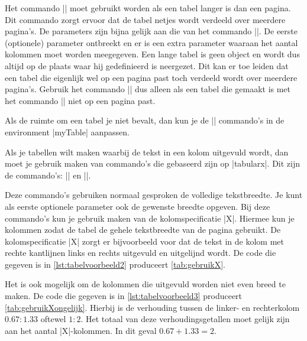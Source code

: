 Het commando |\langetabel| moet gebruikt worden als een tabel langer is dan een pagina.
Dit commando zorgt ervoor dat de tabel netjes wordt verdeeld over meerdere pagina's.
De parameters zijn bijna gelijk aan die van het commando |\tabel|.
De eerste (optionele) parameter ontbreekt en er is een extra parameter waaraan het aantal kolommen moet worden meegegeven.
Een lange tabel is geen  object en wordt dus altijd op de plaats waar hij gedefinieerd is neergezet.
Dit kan er toe leiden dat een tabel die eigenlijk wel op een pagina past toch verdeeld wordt over meerdere pagina's.
Gebruik het commando |\langetabel| dus alleen als een tabel die gemaakt is met het commando |\tabel| niet op een pagina past.

Als de ruimte om een tabel je niet bevalt, dan kun je de |\vspace| commando's in de environment |myTable| aanpassen.

Als je tabellen wilt maken waarbij de tekst in een kolom uitgevuld wordt, dan moet je gebruik maken van commando's die gebaseerd zijn op |tabularx|. 
Dit zijn de commando's:
|\tabelX| en |\langetabelX|.

Deze commando's gebruiken normaal gesproken de volledige tekstbreedte.
Je kunt als eerste optionele parameter ook de gewenste breedte opgeven.
Bij deze commando's kun je gebruik maken van de kolomspecificatie |X|. 
Hiermee kun je kolommen  zodat de tabel de gehele tekstbreedte van de pagina gebruikt.
De kolomspecificatie |X| zorgt er bijvoorbeeld voor dat de tekst in de kolom met rechte kantlijnen links en rechts uitgevuld en uitgelijnd wordt.
De code die gegeven is in \cref{lst:tabelvoorbeeld2} produceert \cref{tab:gebruikX}.



Het is ook mogelijk om de kolommen die uitgevuld worden niet even breed te maken.
De code die gegeven is in \cref{lst:tabelvoorbeeld3} produceert \cref{tab:gebruikXongelijk}.
Hierbij is de verhouding tussen de linker- en rechterkolom $0.67:1.33$ oftewel $1:2$.
Het totaal van deze verhoudingsgetallen moet gelijk zijn aan het aantal |X|-kolommen.
In dit geval $0.67 + 1.33 = 2$.   

